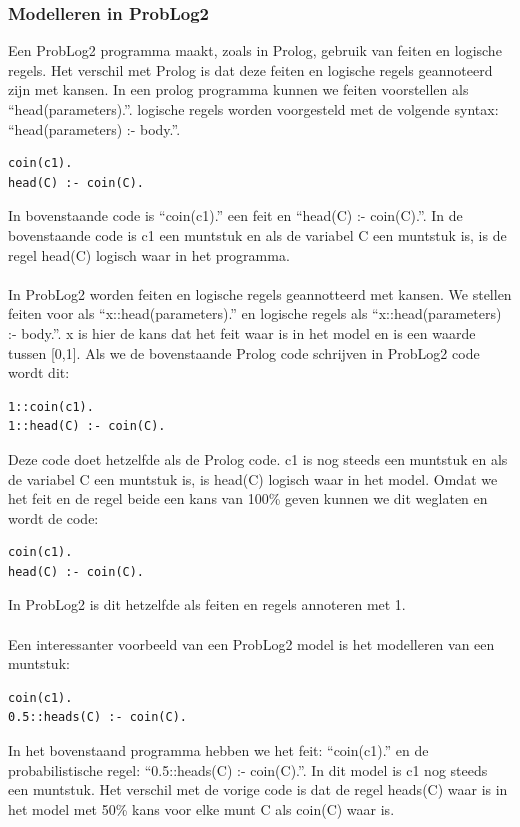\documentclass[12pt,a4paper,oneside]{book}
\theoremstyle{definition}
\newcommand{\quotes}[1]{``#1''}
\begin{document}
\subsubsection{Modelleren in ProbLog2} 
Een ProbLog2 programma maakt, zoals in Prolog, gebruik van feiten en logische regels. Het verschil met Prolog is dat deze feiten en logische regels geannoteerd zijn met kansen. In een prolog programma kunnen we feiten voorstellen als \quotes{head(parameters).}. logische regels worden voorgesteld met de volgende syntax: \quotes{head(parameters) :- body.}.
\begin{lstlisting}
coin(c1).
head(C) :- coin(C).
\end{lstlisting}
In bovenstaande code is \quotes{coin(c1).} een feit en \quotes{head(C) :- coin(C).}. In de bovenstaande code is c1 een muntstuk en als de variabel C een muntstuk is, is de regel head(C) logisch waar in het programma.
\\\\
In ProbLog2 worden feiten en logische regels geannotteerd met kansen. We stellen feiten voor als \quotes{x::head(parameters).} en logische regels als \quotes{x::head(parameters) :- body.}. x is hier de kans dat het feit waar is in het model en is een waarde tussen [0,1]. Als we de bovenstaande Prolog code schrijven in ProbLog2 code wordt dit:
\begin{lstlisting}
1::coin(c1).
1::head(C) :- coin(C).
\end{lstlisting}
Deze code doet hetzelfde als de Prolog code. c1 is nog steeds een muntstuk en als de variabel C een muntstuk is, is head(C) logisch waar in het model. Omdat we het feit en de regel beide een kans van 100\% geven kunnen we dit weglaten en wordt de code:
\begin{lstlisting}
coin(c1).
head(C) :- coin(C).
\end{lstlisting}
In ProbLog2 is dit hetzelfde als feiten en regels annoteren met 1.
\\\\
Een interessanter voorbeeld van een ProbLog2 model is het modelleren van een muntstuk:
\begin{lstlisting}
coin(c1).
0.5::heads(C) :- coin(C).
\end{lstlisting}
In het bovenstaand programma hebben we het feit: \quotes{coin(c1).} en de probabilistische regel: \quotes{0.5::heads(C) :- coin(C).}. In dit model is c1 nog steeds een muntstuk. Het verschil met de vorige code is dat de regel heads(C) waar is in het model met 50\% kans voor elke munt C als coin(C) waar is.
\end{document}
